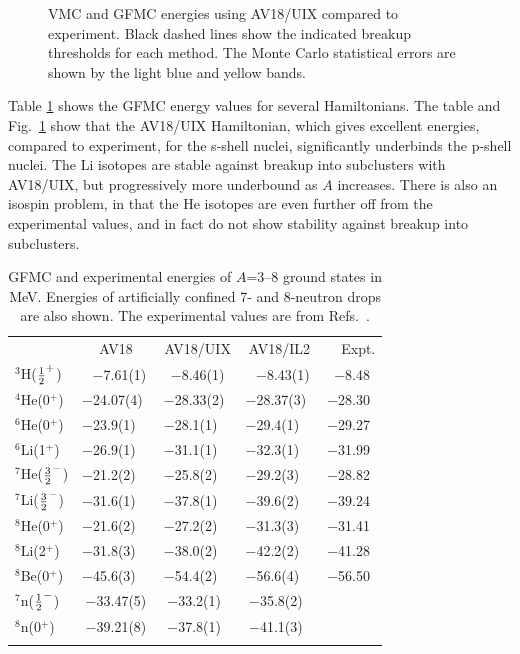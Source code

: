 \begin{figure}
\centerline{}
\caption{VMC and GFMC energies using AV18/UIX compared to experiment.
Black dashed lines show the indicated breakup thresholds for each method.
The Monte Carlo statistical errors are shown by the light blue and yellow bands.}
\label{fig:vmc-gfmc-exp}
\end{figure}

Table \ref{tab:energy} shows the GFMC energy values for several
Hamiltonians.  The table and Fig.~\ref{fig:vmc-gfmc-exp} show that the
AV18/UIX Hamiltonian, which gives excellent energies, compared to
experiment, for the s-shell nuclei, significantly underbinds the p-shell
nuclei.  The Li isotopes are stable against breakup into subclusters with AV18/UIX,
but progressively more underbound as $A$ increases.  There is also an
isospin problem, in that the He isotopes are even further off from the
experimental values, and in fact do not show stability against breakup
into subclusters.

\begin{table}
\caption{GFMC and experimental energies of $A$=3--8 ground states in MeV.
Energies of artificially confined 7- and 8-neutron drops are also shown.
The experimental values are from Refs.~\protect\cite{TUNL3,TUNL4,AS88}.}
\label{tab:energy}
\begin{tabular}{lcccl}
\toprule
                        & AV18         &  AV18/UIX    &  AV18/IL2    & ~~Expt. \\
\colrule
$^3$H($\textstyle{1\over2}^+$)  & ~$-$7.61(1)  & ~$-$8.46(1)~ & ~$-$8.43(1)  & ~$-$8.48   \\
$^4$He(0$^+$)           & $-$24.07(4)~ & $-$28.33(2)~ & $-$28.37(3)~ & $-$28.30  \\
$^6$He(0$^+$)           & $-$23.9(1)~~ & $-$28.1(1)~~ & $-$29.4(1)~~ & $-$29.27  \\
$^6$Li(1$^+$)           & $-$26.9(1)~~ & $-$31.1(1)~~ & $-$32.3(1)~~ & $-$31.99  \\
$^7$He($\textstyle{3\over2}^-$) & $-$21.2(2)~~ & $-$25.8(2)~~ & $-$29.2(3)~~ & $-$28.82  \\
$^7$Li($\textstyle{3\over2}^-$) & $-$31.6(1)~~ & $-$37.8(1)~~ & $-$39.6(2)~~ & $-$39.24  \\
$^8$He(0$^+$)           & $-$21.6(2)~~ & $-$27.2(2)~~ & $-$31.3(3)~~ & $-$31.41  \\
$^8$Li(2$^+$)           & $-$31.8(3)~~ & $-$38.0(2)~~ & $-$42.2(2)~~ & $-$41.28  \\
$^8$Be(0$^+$)           & $-$45.6(3)~~ & $-$54.4(2)~~ & $-$56.6(4)~~ & $-$56.50  \\
\colrule
$^7$n($\textstyle{1\over2}^-$)  & $-$33.47(5)  & $-$33.2(1)~  & $-$35.8(2)~  &          \\
$^8$n(0$^+$)            & $-$39.21(8)  & $-$37.8(1)~  & $-$41.1(3)~  &          \\
\botrule
\end{tabular}
\end{table}

